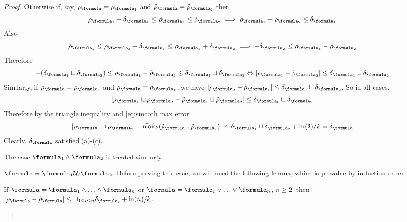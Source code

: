 \begin{proof}
Otherwise if, say, $\robf = \rob_{\formula_1}$ and $\srobf = \srob_{\formula_2}$ then
\[\robfa -\delta_{\formula_1} \leq \srob_{\formula_1} \leq \srob_{\formula_2} \implies \robfa-\srob_{\formula_2} \leq \delta_{\formula_1}\]
Also 
\[\srob_{\formula_2} \leq \robfb+\delta_{\formula_2} \leq \robfa + \delta_{\formula_2} \implies -\delta_{\formula_2} \leq \robfa - \srob_{\formula_2}\]
Therefore
\begin{equation*}
\label{eq:inter}
-(\delta_{\formula_1} \sqcup \delta_{\formula_2})\leq \robfa - \srob_{\formula_2}\leq \delta_{\formula_1} \sqcup \delta_{\formula_2} \Leftrightarrow |\robfa - \srob_{\formula_2}|\leq \delta_{\formula_1} \sqcup \delta_{\formula_2}
\end{equation*}
Similarly, if $\robf = \rob_{\formula_2}$ and $\srobf = \srob_{\formula_1}$, we have $|\robfb - \srob_{\formula_1}|\leq  \delta_{\formula_1} \sqcup \delta_{\formula_2}$.
So in all cases, 
\[|\robfa \sqcup \robfb - \srob_{\formula_1} \sqcup \srob_{\formula_2}|\leq \delta_{\formula_1} \sqcup \delta_{\formula_2}\]
Therefore by the triangle inequality and \eqref{eq:smooth max error}
\[|\robfa \sqcup \robfb - \smax_k(\srob_{\formula_1} , \srob_{\formula_2})|\leq  \delta_{\formula_1} \sqcup \delta_{\formula_2} + \ln(2)/k  = \delta_\formula\]
Clearly, $\delta_\formula$ satisfied (a)-(c).

The case $\formula_1 \land \formula_2$ is treated similarly.

\underline{$\formula = \formula_1 \until_I \formula_2$.} 
Before proving this case, we will need the following lemma, which is provable by induction on $n$:
\begin{lemma}
	\label{lemma:n-ary apx}
	If $\formula = \formula_1\land \ldots\land \formula_n$ or $\formula = \formula_1\lor \ldots\lor \formula_n$, $n\geq 2$, then 
	$|\robf - \srobf| \leq \sqcup_{1\leq i \leq n}\delta_{\formula_i} + \ln(n)/k$.
\end{lemma}


\end{proof}
